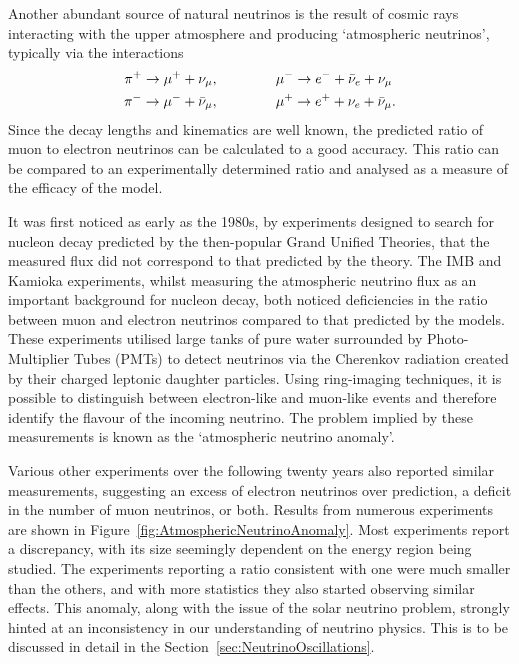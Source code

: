 Another abundant source of natural neutrinos is the result of cosmic rays interacting with the upper atmosphere and producing `atmospheric neutrinos', typically via the interactions \cite{Gaisser1990}
\begin{align}
  \pi^+ \rightarrow \mu^+ + \nu_{\mu}, &\hspace{1.5cm} \mu^- \rightarrow e^- + \bar{\nu}_e + \nu_{\mu} \\
  \pi^- \rightarrow \mu^- + \bar{\nu}_{\mu}, &\hspace{1.5cm} \mu^+ \rightarrow e^+ + \nu_e + \bar{\nu}_{\mu}.
\end{align}
Since the decay lengths and kinematics are well known, the predicted ratio of muon to electron neutrinos can be calculated to a good accuracy.  This ratio can be compared to an experimentally determined ratio and analysed as a measure of the efficacy of the model.

It was first noticed as early as the 1980s, by experiments designed to search for nucleon decay predicted by the then-popular Grand Unified Theories, that the measured flux did not correspond to that predicted by the theory.  The IMB \cite{Haines1986} and Kamioka \cite{Hirata1988} experiments, whilst measuring the atmospheric neutrino flux as an important background for nucleon decay, both noticed deficiencies in the ratio between muon and electron neutrinos compared to that predicted by the models.  These experiments utilised large tanks of pure water surrounded by Photo-Multiplier Tubes (PMTs) to detect neutrinos via the Cherenkov radiation created by their charged leptonic daughter particles.  Using ring-imaging techniques, it is possible to distinguish between electron-like and muon-like events and therefore identify the flavour of the incoming neutrino.  The problem implied by these measurements is known as the `atmospheric neutrino anomaly'.

Various other experiments over the following twenty years also reported similar measurements, suggesting an excess of electron neutrinos over prediction, a deficit in the number of muon neutrinos, or both.  Results from numerous experiments are shown in Figure~\ref{fig:AtmosphericNeutrinoAnomaly}.  Most experiments report a discrepancy, with its size seemingly dependent on the energy region being studied.  The experiments reporting a ratio consistent with one were much smaller than the others, and with more statistics they also started observing similar effects.  This anomaly, along with the issue of the solar neutrino problem, strongly hinted at an inconsistency in our understanding of neutrino physics.  This is to be discussed in detail in the Section~\ref{sec:NeutrinoOscillations}.

